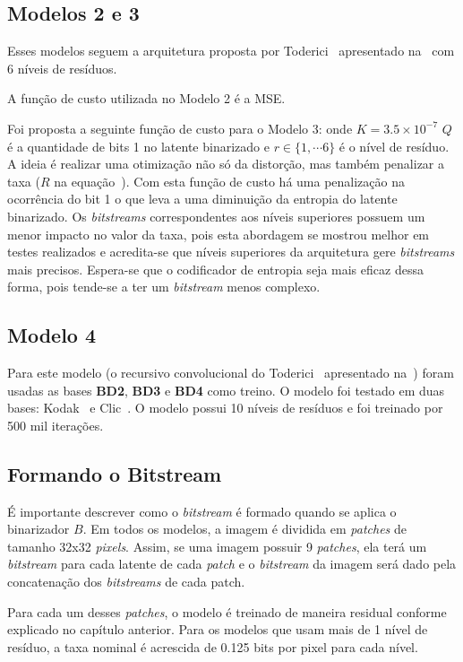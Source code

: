 \subsection{Modelos 2 e 3}
Esses modelos seguem a arquitetura proposta por Toderici~\cite{toderici2016} apresentado na~ com 6 níveis de resíduos. 

A função de custo utilizada no Modelo 2 é a \acrshort{MSE}. 

Foi proposta a seguinte função de custo para o Modelo 3:  onde $K = 3.5 \times 10^{-7}$ $Q$ é a quantidade de bits 1 no latente binarizado e $r \in \{1, \cdots 6\}$ é o nível de resíduo. A ideia é realizar uma otimização não só da distorção, mas também penalizar a taxa ($R$ na equação~). Com esta função de custo há uma penalização na ocorrência do bit 1 o que leva a uma diminuição da entropia do latente binarizado. Os \textit{bitstreams} correspondentes aos níveis superiores possuem um menor impacto no valor da taxa, pois esta abordagem se mostrou melhor em testes realizados e acredita-se que níveis superiores da arquitetura gere \textit{bitstreams} mais precisos. Espera-se que o codificador de entropia seja mais eficaz dessa forma, pois tende-se a ter um \textit{bitstream} menos complexo.
\subsection{Modelo 4}
Para este modelo (o recursivo convolucional do Toderici~\cite{toderici2016} apresentado na~) foram usadas as bases \textbf{BD2}, \textbf{BD3} e \textbf{BD4} como treino. O modelo foi testado em duas bases: Kodak~\cite{kodak} e Clic~\cite{clic}. O modelo possui 10 níveis de resíduos e foi treinado por 500 mil iterações.
\subsection{Formando o Bitstream}
É importante descrever como o \textit{bitstream} é formado quando se aplica o binarizador $B$. Em todos os modelos, a imagem é dividida em \textit{patches} de tamanho 32x32 \textit{pixels}. Assim, se uma imagem possuir 9 \textit{patches}, ela terá um \textit{bitstream} para cada latente de cada \textit{patch} e o \textit{bitstream} da imagem será dado pela concatenação dos \textit{bitstreams} de cada patch. 

Para cada um desses \textit{patches}, o modelo é treinado de maneira residual conforme explicado no capítulo anterior. Para os modelos que usam mais de 1 nível de resíduo, a taxa nominal é acrescida de 0.125 bits por pixel para cada nível. 

